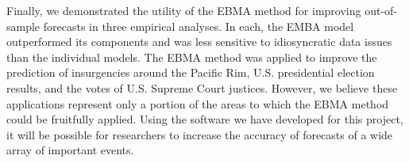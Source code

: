 Finally, we demonstrated the utility of the EBMA method for improving
out-of-sample forecasts in three empirical analyses.  In each, the
EMBA model outperformed its components and was less sensitive to
idiosyncratic data issues than the individual models.  The EBMA method
was applied to improve the prediction of insurgencies around the
Pacific Rim, U.S. presidential election results, and the votes of
U.S. Supreme Court justices. However, we believe these applications
represent only a portion of the areas to which the EBMA method could
be fruitfully applied.  Using the software we have developed for this
project, it will be possible for researchers to increase the accuracy
of forecasts of a wide array of important events.

